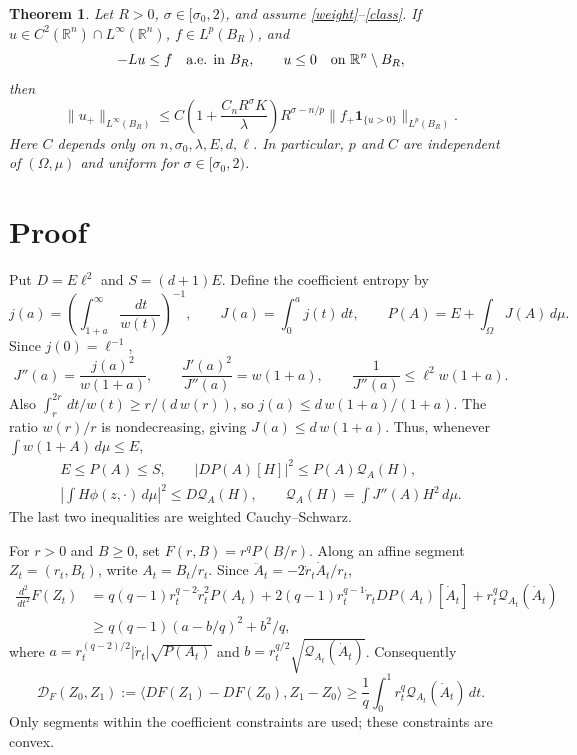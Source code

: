 \documentclass{article}
\newtheorem{theorem}{Theorem}
\newcommand{\R}{\mathbb R}
\newcommand{\dd}{\,d}
\newcommand{\one}{\mathbf 1}
\begin{document}
\begin{theorem}\label{main}
Let $R>0$, $\sigma\in[\sigma_0,2)$, and assume \eqref{weight}--\eqref{class}. If $u\in C^2(\R^n)\cap L^\infty(\R^n)$, $f\in L^p(B_R)$, and
\[
 -Lu\le f\quad\hbox{a.e. in }B_R,\qquad
 u\le0\quad\hbox{on }\R^n\setminus B_R,
\]
then
\begin{equation}\label{abp}
 \|u_+\|_{L^\infty(B_R)}
 \le C\left(1+\frac{C_nR^\sigma K}{\lambda}\right)
 R^{\sigma-n/p}
 \|f_+\one_{\{u>0\}}\|_{L^p(B_R)}.
\end{equation}
Here $C$ depends only on $n,\sigma_0,\lambda,E,d,\ell$. In particular, $p$ and $C$ are independent of $(\Omega,\mu)$ and uniform for $\sigma\in[\sigma_0,2)$.
\end{theorem}

\section{Proof}

Put $D=E\ell^2$ and $S=(d+1)E$. Define the coefficient entropy by
\[
 j(a)=\left(\int_{1+a}^\infty\frac{\dd t}{w(t)}\right)^{-1},
 \qquad J(a)=\int_0^a j(t)\dd t,
 \qquad P(A)=E+\int_\Omega J(A)\dd\mu.
\]
Since $j(0)=\ell^{-1}$,
\[
 J''(a)=\frac{j(a)^2}{w(1+a)},\qquad
 \frac{J'(a)^2}{J''(a)}=w(1+a),\qquad
 \frac1{J''(a)}\le\ell^2w(1+a).
\]
Also $\int_r^{2r}\dd t/w(t)\ge r/(d\,w(r))$, so $j(a)\le d\,w(1+a)/(1+a)$. The ratio $w(r)/r$ is nondecreasing, giving $J(a)\le d\,w(1+a)$. Thus, whenever $\int w(1+A)\dd\mu\le E$,
\begin{equation}\label{entropy-bounds}
 \begin{gathered}
 E\le P(A)\le S,\qquad
 |DP(A)[H]|^2\le P(A)\mathcal Q_A(H),\\
 \left|\int H\phi(z,\cdot)\dd\mu\right|^2\le D\mathcal Q_A(H),
 \qquad\mathcal Q_A(H)=\int J''(A)H^2\dd\mu.
 \end{gathered}
\end{equation}
The last two inequalities are weighted Cauchy--Schwarz.

For $r>0$ and $B\ge0$, set $F(r,B)=r^qP(B/r)$. Along an affine segment $Z_t=(r_t,B_t)$, write $A_t=B_t/r_t$. Since $\ddot A_t=-2\dot r_t\dot A_t/r_t$,
\begin{align*}
 \frac{\dd^2}{\dd t^2}F(Z_t)
 &=q(q-1)r_t^{q-2}\dot r_t^2P(A_t)
   +2(q-1)r_t^{q-1}\dot r_tDP(A_t)[\dot A_t]
   +r_t^q\mathcal Q_{A_t}(\dot A_t)\\
 &\ge q(q-1)(a-b/q)^2+b^2/q,
\end{align*}
where $a=r_t^{(q-2)/2}|\dot r_t|\sqrt{P(A_t)}$ and $b=r_t^{q/2}\sqrt{\mathcal Q_{A_t}(\dot A_t)}$. Consequently
\begin{equation}\label{quotient}
 \mathcal D_F(Z_0,Z_1)
 :=\langle DF(Z_1)-DF(Z_0),Z_1-Z_0\rangle
 \ge\frac1q\int_0^1r_t^q\mathcal Q_{A_t}(\dot A_t)\dd t.
\end{equation}
Only segments within the coefficient constraints are used; these constraints are convex.
\end{document}
